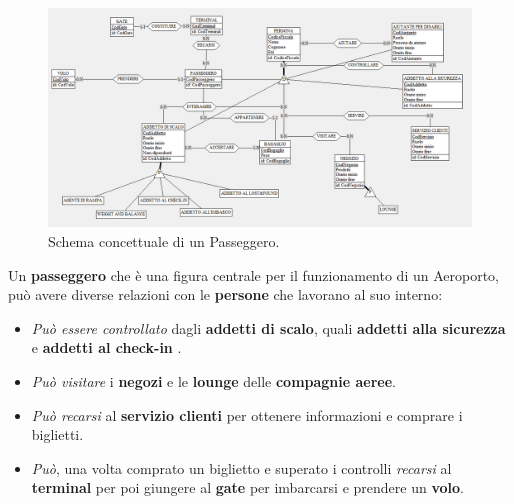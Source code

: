 \begin{figure}[H] %
	\centering
	\includegraphics[width=1.2\textwidth, height=1.2\textheight, keepaspectratio]{./img/Passeggero.png}
	\caption{Schema concettuale di un Passeggero.}
	\label{fig:schema_passeggero}
\end{figure}

\pagebreak

\textsf{Un \textbf{passeggero} che è una figura centrale per il funzionamento di un Aeroporto, può avere diverse relazioni con le \textbf{persone} che lavorano al suo interno:}\\

\begin{itemize}
	\item \textsf{\small \emph{Può essere controllato} dagli \textbf{addetti di scalo}, quali \textbf{addetti alla sicurezza} e \textbf{addetti al check-in} .}\\
	\item \textsf{\small \emph{Può visitare} i \textbf{negozi} e le \textbf{lounge} delle \textbf{compagnie aeree}}.\\
	\item \textsf{\small \emph{Può recarsi} al \textbf{servizio clienti} per ottenere informazioni e comprare i biglietti.}\\
	\item \textsf{\small \emph{Può}, una volta comprato un biglietto e superato i controlli \emph{recarsi} al \textbf{terminal} per poi giungere al \textbf{gate} per imbarcarsi e prendere un \textbf{volo}.}\\
\end{itemize}

